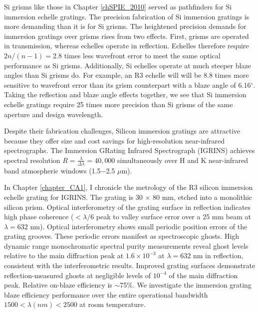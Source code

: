 Si grisms like those in Chapter \ref{chSPIE_2010} served as pathfinders for Si immersion echelle gratings.  The precision fabrication of Si immersion gratings is more demanding than it is for Si grisms.  The heightened precision demands for immersion gratings over grisms rises from two effects.  First, grisms are operated in transmission, whereas echelles operate in reflection.  Echelles therefore require $2n/(n-1) = 2.8$ times less wavefront error to meet the same optical performance as Si grisms.  Additionally, Si echelles operate at much steeper blaze angles than Si grisms do.  For example, an R3 echelle will will be 8.8 times more sensitive to wavefront error than its grism counterpart with a blaze angle of 6.16$^\circ$.  Taking the reflection and blaze angle effects together, we see that Si immersion echelle gratings require 25 times more precision than Si grisms of the same aperture and design wavelength.  

Despite their fabrication challenges, Silicon immersion gratings are attractive because they offer size and cost savings for high-resolution near-infrared spectrographs.  The Immersion GRating Infrared Spectrograph (IGRINS) \cite{2014SPIE.CHANPARK.IGRINS} achieves spectral resolution $R=\frac{\lambda}{\Delta \lambda} = 40,000$ simultaneously over H and K near-infrared band atmospheric windows (1.5$-$2.5 $\mu$m).  

In Chapter \ref{chapter_CA1}, I chronicle the metrology of the R3 silicon immersion echelle grating for IGRINS.  The grating is 30 $\times$ 80 mm, etched into a monolithic silicon prism.  Optical interferometry of the grating surface in reflection indicates high phase coherence ($< \lambda/6$ peak to valley surface error over a 25 mm beam at $\lambda=632$ nm).  Optical interferometry shows small periodic position errors of the grating grooves.  These periodic errors manifest as spectroscopic ghosts.  High dynamic range monochromatic spectral purity measurements reveal ghost levels relative to the main diffraction peak at $1.6 \times 10^{-3}$ at $\lambda = 632$ nm in reflection, consistent with the interferometric results.  Improved grating surfaces demonstrate reflection-measured ghosts at negligible levels of $10^{-4}$ of the main diffraction peak.  Relative on-blaze efficiency is $\sim$75\%.  We investigate the immersion grating blaze efficiency performance over the entire operational bandwidth $1500 < \lambda(nm) < 2500$ at room temperature.


